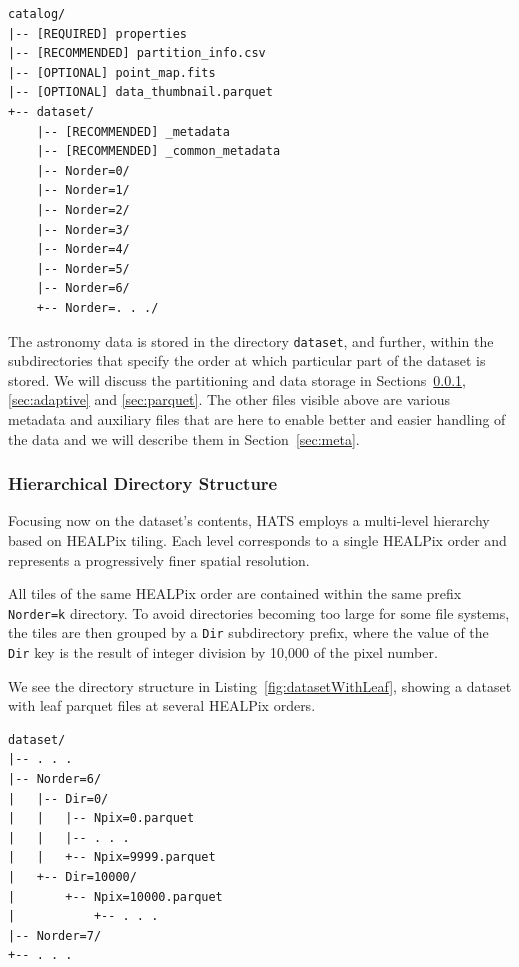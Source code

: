\documentclass[11pt,a4paper]{ivoa}
\begin{document}
\begin{minipage}{\linewidth}
\begin{lstlisting}[caption=Example catalog directory contents, label=fig:exampleCatalogStructure]
catalog/
|-- [REQUIRED] properties
|-- [RECOMMENDED] partition_info.csv
|-- [OPTIONAL] point_map.fits
|-- [OPTIONAL] data_thumbnail.parquet
+-- dataset/
    |-- [RECOMMENDED] _metadata
    |-- [RECOMMENDED] _common_metadata
    |-- Norder=0/
    |-- Norder=1/
    |-- Norder=2/
    |-- Norder=3/
    |-- Norder=4/
    |-- Norder=5/
    |-- Norder=6/
    +-- Norder=. . ./
\end{lstlisting}
\end{minipage}

The astronomy data is stored in the directory \texttt{dataset}, and further, within the subdirectories that specify the order at which particular part of the dataset is stored. 
We will discuss the partitioning and data storage in Sections~\ref{sec:hierarchical}, \ref{sec:adaptive} and \ref{sec:parquet}. 
The other files visible above are various metadata and auxiliary files that are here to enable better and easier handling of the data and we will describe them in Section~\ref{sec:meta}. 
    
\subsubsection{Hierarchical Directory Structure} \label{sec:hierarchical}
Focusing now on the dataset's contents, HATS employs a multi-level hierarchy based on HEALPix tiling.
Each level corresponds to a single HEALPix order and represents a progressively finer spatial resolution.

All tiles of the same HEALPix order are contained within the same prefix \texttt{Norder=k} directory. 
To avoid directories becoming too large for some file systems, the tiles are then grouped by a \texttt{Dir} subdirectory prefix,
where the value of the \texttt{Dir} key is the result of integer division by 10,000 of the pixel number.

We see the directory structure in Listing~\ref{fig:datasetWithLeaf}, showing a dataset with leaf parquet files at several HEALPix orders.

\begin{minipage}{\linewidth}
\begin{lstlisting}[caption=Example catalog dataset directory contents, label=fig:datasetWithLeaf]
dataset/
|-- . . .
|-- Norder=6/
|   |-- Dir=0/
|   |   |-- Npix=0.parquet
|   |   |-- . . .
|   |   +-- Npix=9999.parquet
|   +-- Dir=10000/
|       +-- Npix=10000.parquet
|           +-- . . .
|-- Norder=7/
+-- . . .
\end{lstlisting} 
\end{minipage}
\end{document}
